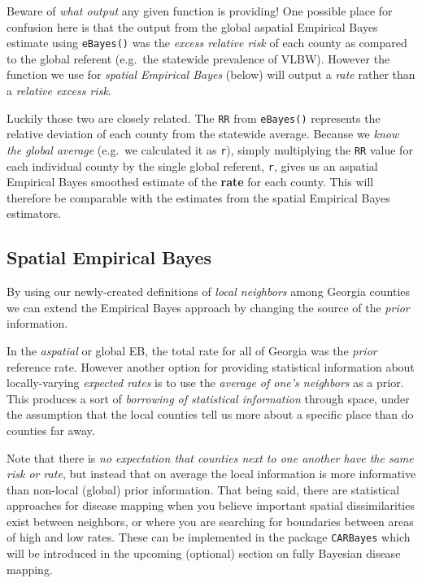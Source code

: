 \documentclass[
]{book}
\newenvironment{rmdcaution}[1]
  {
  \begin{itemize}
  \renewcommand{\labelitemi}{
    \raisebox{-.7\height}[0pt][0pt]{
      {\setkeys{Gin}{width=3em,keepaspectratio}\texttt{[image: images/\#1]}}
    }
  }
  \setlength{\fboxsep}{1em}
  \begin{caution}
  \item
  }
  {
  \end{caution}
  \end{itemize}
  }
\begin{document}
\begin{rmdcaution}{caution}
Beware of \emph{what output} any given function is providing! One possible place for confusion here is that the output from the global aspatial Empirical Bayes estimate using \texttt{eBayes()} was the \emph{excess relative risk} of each county as compared to the global referent (e.g.~the statewide prevalence of VLBW). However the function we use for \emph{spatial Empirical Bayes} (below) will output a \emph{rate} rather than a \emph{relative excess risk}.

Luckily those two are closely related. The \texttt{RR} from \texttt{eBayes()} represents the relative deviation of each county from the statewide average. Because we \emph{know the global average} (e.g.~we calculated it as \texttt{r}), simply multiplying the \texttt{RR} value for each individual county by the single global referent, \texttt{r}, gives us an aspatial Empirical Bayes smoothed estimate of the \textbf{rate} for each county. This will therefore be comparable with the estimates from the spatial Empirical Bayes estimators.

\end{rmdcaution}

\hypertarget{spatial-empirical-bayes}{%
\subsection{Spatial Empirical Bayes}\label{spatial-empirical-bayes}}

By using our newly-created definitions of \emph{local neighbors} among Georgia counties we can extend the Empirical Bayes approach by changing the source of the \emph{prior} information.

In the \emph{aspatial} or global EB, the total rate for all of Georgia was the \emph{prior} reference rate. However another option for providing statistical information about locally-varying \emph{expected rates} is to use the \emph{average of one's neighbors} as a prior. This produces a sort of \emph{borrowing of statistical information} through space, under the assumption that the local counties tell us more about a specific place than do counties far away.

Note that there is \emph{no expectation that counties next to one another have the same risk or rate}, but instead that on average the local information is more informative than non-local (global) prior information. That being said, there are statistical approaches for disease mapping when you believe important spatial dissimilarities exist between neighbors, or where you are searching for boundaries between areas of high and low rates. These can be implemented in the package \texttt{CARBayes} which will be introduced in the upcoming (optional) section on fully Bayesian disease mapping.
\end{document}

